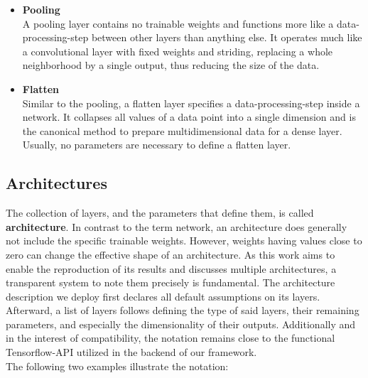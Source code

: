 \begin{itemize}
	\item \textbf{Pooling}\\
	A pooling layer contains no trainable weights and functions more like a data-processing-step between other layers than anything else. It operates much like a convolutional layer with fixed weights and striding,  replacing a whole neighborhood by a single output, thus reducing the size of the data.\\
	\item \textbf{Flatten}\\  
	Similar to the pooling, a flatten layer specifies a data-processing-step inside a network. It collapses all values of a data point into a single dimension and is the canonical method to prepare multidimensional data for a dense layer. Usually, no parameters are necessary to define a flatten layer.\\
\end{itemize}

\subsection{Architectures}
The collection of layers, and the parameters that define them, is called \textbf{architecture}. In contrast to the term network, an architecture does generally not include the specific trainable weights. However, weights having values close to zero can change the effective shape of an architecture.
As this work aims to enable the reproduction of its results and discusses multiple architectures, a transparent system to note them precisely is fundamental. The architecture description we deploy first declares all default assumptions on its layers. Afterward, a list of layers follows defining the type of said layers, their remaining parameters, and especially the dimensionality of their outputs. Additionally and in the interest of compatibility, the notation remains close to the functional Tensorflow-API utilized in the backend of our framework.\\
The following two examples illustrate the notation:

